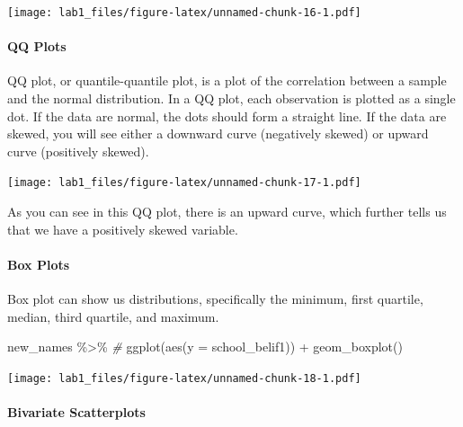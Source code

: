 \documentclass[
]{article}
\newenvironment{Shaded}{\begin{snugshade}}{\end{snugshade}}
\newcommand{\AttributeTok}[1]{\textcolor[rgb]{0.77,0.63,0.00}{#1}}
\newcommand{\CommentTok}[1]{\textcolor[rgb]{0.56,0.35,0.01}{\textit{#1}}}
\newcommand{\FunctionTok}[1]{\textcolor[rgb]{0.00,0.00,0.00}{#1}}
\newcommand{\NormalTok}[1]{#1}
\newcommand{\SpecialCharTok}[1]{\textcolor[rgb]{0.00,0.00,0.00}{#1}}
\begin{document}
\texttt{[image: lab1\_files/figure-latex/unnamed-chunk-16-1.pdf]}

\hypertarget{qq-plots}{%
\paragraph{QQ Plots}\label{qq-plots}}

QQ plot, or quantile-quantile plot, is a plot of the correlation between
a sample and the normal distribution. In a QQ plot, each observation is
plotted as a single dot. If the data are normal, the dots should form a
straight line. If the data are skewed, you will see either a downward
curve (negatively skewed) or upward curve (positively skewed).

\begin{Shaded}
\end{Shaded}

\texttt{[image: lab1\_files/figure-latex/unnamed-chunk-17-1.pdf]}

As you can see in this QQ plot, there is an upward curve, which further
tells us that we have a positively skewed variable.

\hypertarget{box-plots}{%
\paragraph{Box Plots}\label{box-plots}}

Box plot can show us distributions, specifically the minimum, first
quartile, median, third quartile, and maximum.

\begin{Shaded}
\begin{Highlighting}[]
\NormalTok{new\_names }\SpecialCharTok{\%\textgreater{}\%} \CommentTok{\# }
  \FunctionTok{ggplot}\NormalTok{(}\FunctionTok{aes}\NormalTok{(}\AttributeTok{y =}\NormalTok{ school\_belif1)) }\SpecialCharTok{+}
  \FunctionTok{geom\_boxplot}\NormalTok{() }
\end{Highlighting}
\end{Shaded}

\texttt{[image: lab1\_files/figure-latex/unnamed-chunk-18-1.pdf]}

\hypertarget{bivariate-scatterplots}{%
\paragraph{Bivariate Scatterplots}\label{bivariate-scatterplots}}
\end{document}
